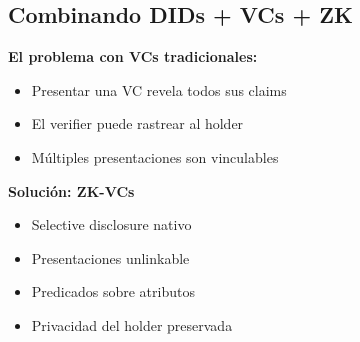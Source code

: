 \documentclass[11pt,a4paper,twoside]{book}
\theoremstyle{definition}
\theoremstyle{remark}
\begin{document}
\subsection{Combinando DIDs + VCs + ZK}

\begin{keyidea}
\textbf{El problema con VCs tradicionales:}
\begin{itemize}
    \item Presentar una VC revela todos sus claims
    \item El verifier puede rastrear al holder
    \item Múltiples presentaciones son vinculables
\end{itemize}

\textbf{Solución: ZK-VCs}
\begin{itemize}
    \item Selective disclosure nativo
    \item Presentaciones unlinkable
    \item Predicados sobre atributos
    \item Privacidad del holder preservada
\end{itemize}
\end{keyidea}
\end{document}

